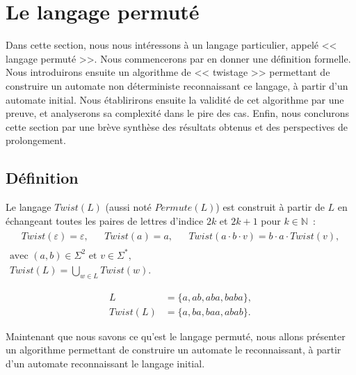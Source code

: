 \section{Le langage permuté}

Dans cette section, nous nous intéressons à un langage particulier, appelé
<< langage permuté >>. Nous commencerons par en donner une définition
formelle. Nous introduirons ensuite un algorithme de << twistage >> permettant
de construire un automate non déterministe reconnaissant ce langage, à partir
d’un automate initial. Nous établirirons ensuite la validité de cet algorithme
par une preuve, et analyserons sa complexité dans le pire des cas. Enfin, nous
conclurons cette section par une brève synthèse des résultats obtenus et des
perspectives de prolongement.

\subsection{Définition}

\begin{definition}
  Le langage \(Twist(L)\) (aussi noté \(Permute(L)\)) est construit à partir
  de \(L\) en échangeant toutes les paires de lettres d'indice \(2k\) et
  \(2k + 1\) pour \(k \in \mathbb{N}\)~:
  \begin{gather*}
    \begin{align*}
      &Twist(\varepsilon) = \varepsilon,&
      &Twist(a) = a,&
      &Twist(a \cdot b \cdot v) = b \cdot a \cdot Twist(v),&
    \end{align*} \\
    \text{avec } (a, b) \in \Sigma^2 \text{ et } v \in \Sigma^*, \\
    Twist(L) = \bigcup_{w \in L} Twist(w).
  \end{gather*}
\end{definition}

\begin{example}
  \vspace{-\baselineskip}
  \begin{align*}
    L &= \{a, ab, aba, baba\}, \\
    Twist(L) &= \{a, ba, baa, abab\}.
  \end{align*}
\end{example}

Maintenant que nous savons ce qu’est le langage permuté, nous allons présenter
un algorithme permettant de construire un automate le reconnaissant, à partir
d’un automate reconnaissant le langage initial.

